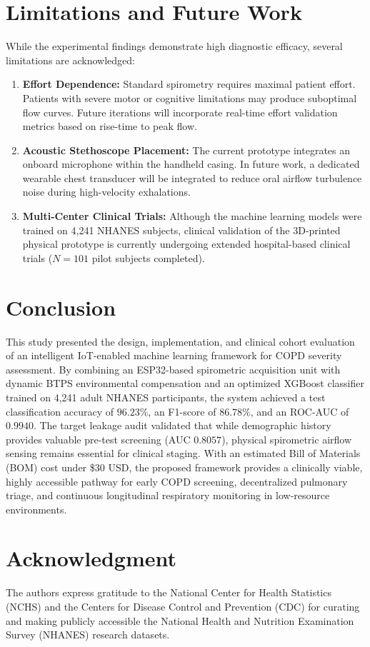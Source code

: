 \documentclass[conference]{IEEEtran}
\begin{document}
\section{Limitations and Future Work}
While the experimental findings demonstrate high diagnostic efficacy, several limitations are acknowledged:
\begin{enumerate}
    \item \textbf{Effort Dependence:} Standard spirometry requires maximal patient effort. Patients with severe motor or cognitive limitations may produce suboptimal flow curves. Future iterations will incorporate real-time effort validation metrics based on rise-time to peak flow.
    \item \textbf{Acoustic Stethoscope Placement:} The current prototype integrates an onboard microphone within the handheld casing. In future work, a dedicated wearable chest transducer will be integrated to reduce oral airflow turbulence noise during high-velocity exhalations.
    \item \textbf{Multi-Center Clinical Trials:} Although the machine learning models were trained on 4,241 NHANES subjects, clinical validation of the 3D-printed physical prototype is currently undergoing extended hospital-based clinical trials ($N=101$ pilot subjects completed).
\end{enumerate}

\section{Conclusion}
This study presented the design, implementation, and clinical cohort evaluation of an intelligent IoT-enabled machine learning framework for COPD severity assessment. By combining an ESP32-based spirometric acquisition unit with dynamic BTPS environmental compensation and an optimized XGBoost classifier trained on 4,241 adult NHANES participants, the system achieved a test classification accuracy of $96.23\%$, an F1-score of $86.78\%$, and an ROC-AUC of $0.9940$. The target leakage audit validated that while demographic history provides valuable pre-test screening (AUC $0.8057$), physical spirometric airflow sensing remains essential for clinical staging. With an estimated Bill of Materials (BOM) cost under \$30 USD, the proposed framework provides a clinically viable, highly accessible pathway for early COPD screening, decentralized pulmonary triage, and continuous longitudinal respiratory monitoring in low-resource environments.

\section*{Acknowledgment}
The authors express gratitude to the National Center for Health Statistics (NCHS) and the Centers for Disease Control and Prevention (CDC) for curating and making publicly accessible the National Health and Nutrition Examination Survey (NHANES) research datasets.



\end{document}
